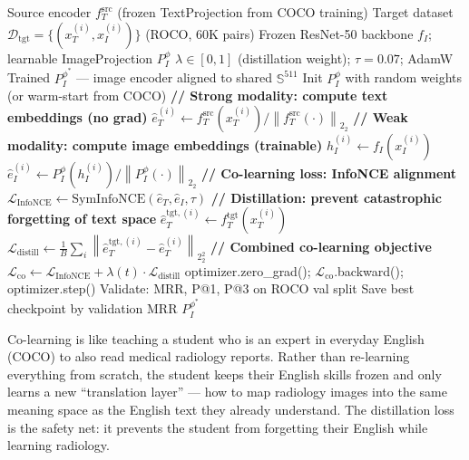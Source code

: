\documentclass[12pt,a4paper]{article}
\theoremstyle{definition}
\theoremstyle{plain}
\theoremstyle{remark}
\newcommand{\Sph}{\mathbb{S}}
\newcommand{\Norm}[1]{\left\|#1\right\|_2}
\begin{document}
\begin{algorithm}[H]
\caption{Challenge 4: Co-learning via Surgical Domain Transfer}
\label{alg:colearn}
\begin{algorithmic}[1]
\Require Source encoder $f_T^{\text{src}}$ (frozen TextProjection from COCO training)
\Require Target dataset $\mathcal{D}_{\text{tgt}} = \{(x_T^{(i)}, x_I^{(i)})\}$ (ROCO, 60K pairs)
\Require Frozen ResNet-50 backbone $f_I$; learnable ImageProjection $P_I^\phi$
\Require $\lambda \in [0,1]$ (distillation weight); $\tau = 0.07$; AdamW
\Ensure Trained $P_I^{\phi^*}$ — image encoder aligned to shared $\Sph^{511}$
\State Init $P_I^\phi$ with random weights (or warm-start from COCO)
    \State \textbf{// Strong modality: compute text embeddings (no grad)}
    \State $\hat{e}_T^{(i)} \gets f_T^{\text{src}}(x_T^{(i)}) / \Norm{f_T^{\text{src}}(\cdot)}_2$ 
    \State \textbf{// Weak modality: compute image embeddings (trainable)}
    \State $h_I^{(i)} \gets f_I(x_I^{(i)})$ 
    \State $\hat{e}_I^{(i)} \gets P_I^\phi(h_I^{(i)}) / \Norm{P_I^\phi(\cdot)}_2$
    \State \textbf{// Co-learning loss: InfoNCE alignment}
    \State $\mathcal{L}_{\text{InfoNCE}} \gets \text{SymInfoNCE}(\hat{e}_T, \hat{e}_I, \tau)$ 
    \State \textbf{// Distillation: prevent catastrophic forgetting of text space}
    \State $\hat{e}_T^{\text{tgt},(i)} \gets f_T^{\text{tgt}}(x_T^{(i)})$ 
    \State $\mathcal{L}_{\text{distill}} \gets \frac{1}{B}\sum_i \Norm{\hat{e}_T^{\text{tgt},(i)} - \hat{e}_T^{(i)}}_2^2$
    \State \textbf{// Combined co-learning objective}
    \State $\mathcal{L}_{\text{co}} \gets \mathcal{L}_{\text{InfoNCE}} + \lambda(t) \cdot \mathcal{L}_{\text{distill}}$
    \State optimizer.zero\_grad(); $\mathcal{L}_{\text{co}}$.backward(); optimizer.step()
  \EndFor
  \State Validate: MRR, P@1, P@3 on ROCO val split
  \State Save best checkpoint by validation MRR
\EndFor
\State \Return $P_I^{\phi^*}$
\end{algorithmic}
\end{algorithm}

\begin{tcolorbox}[laymanbox]
Co-learning is like teaching a student who is an expert in everyday English (COCO) to also read medical radiology reports. Rather than re-learning everything from scratch, the student keeps their English skills frozen and only learns a new ``translation layer'' — how to map radiology images into the same meaning space as the English text they already understand. The distillation loss is the safety net: it prevents the student from forgetting their English while learning radiology.
\end{tcolorbox}
\end{document}
